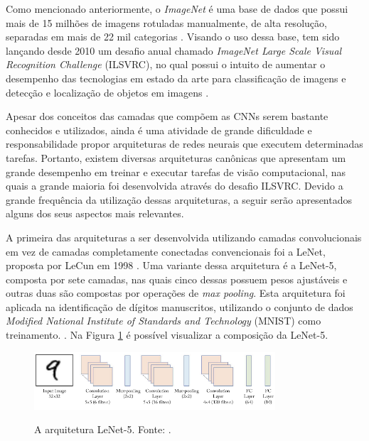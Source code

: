 Como mencionado anteriormente, o \emph{ImageNet} é uma base de dados que possui mais de 15 milhões de imagens rotuladas manualmente, de alta resolução, separadas em mais de 22 mil categorias \cite{imagenet}. Visando o uso dessa base, tem sido lançando desde 2010 um desafio anual chamado \emph{ImageNet Large Scale Visual Recognition Challenge} (ILSVRC), no qual possui o intuito de aumentar o desempenho das tecnologias em estado da arte para classificação de imagens e detecção e localização de objetos em imagens \cite{sewak}.

Apesar dos conceitos das camadas que compõem as CNNs serem bastante conhecidos e utilizados, ainda é uma atividade de grande dificuldade e responsabilidade propor arquiteturas de redes neurais que executem determinadas tarefas. Portanto, existem diversas arquiteturas canônicas que apresentam um grande desempenho em treinar e executar tarefas de visão computacional, nas quais a grande maioria foi desenvolvida através do desafio ILSVRC. Devido a grande frequência da utilização dessas arquiteturas, a seguir serão apresentados alguns dos seus aspectos mais relevantes.

A primeira das arquiteturas a ser desenvolvida utilizando camadas convolucionais em vez de camadas completamente conectadas convencionais foi a LeNet, proposta por LeCun em 1998 \cite{lecun}. Uma variante dessa arquitetura é a LeNet-5, composta por sete camadas, nas quais cinco dessas possuem pesos ajustáveis e outras duas são compostas por operações de \emph{max pooling}. Esta arquitetura foi aplicada na identificação de dígitos manuscritos, utilizando o conjunto de dados \emph{Modified National Institute of Standards and Technology} (MNIST) como treinamento. \cite{khan}. Na Figura \ref{fig:lenet} é possível visualizar a composição da LeNet-5.

\begin{figure}[h!]
  \centering
  \caption{A arquitetura LeNet-5. Fonte: \cite{khan}.}
  \includegraphics[width=0.8\textwidth]{imgs/lenet5}
  \label{fig:lenet}
\end{figure}

